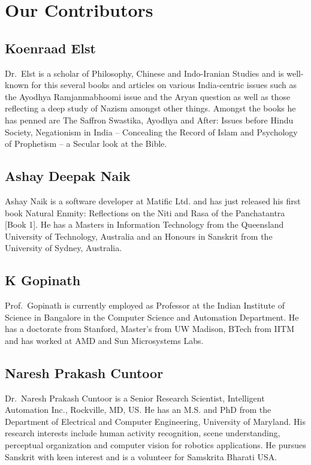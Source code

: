\chapter*{Our Contributors}\label{contributors}

\lhead[\small\thepage]{}
\rhead[]{\small\thepage}
\chead[]{}
\cfoot[]{}

\section*{Koenraad Elst}

Dr.~Elst is a scholar of Philosophy, Chinese and Indo-Iranian Studies and is well-known for this several books and articles on various India-centric issues such as the Ayodhya Ramjanmabhoomi issue and the Aryan question as well as those reflecting a deep study of Nazism amongst other things. Amongst the books he has penned are The Saffron Swastika, Ayodhya and After: Issues before Hindu Society, Negationism in India – Concealing the Record of Islam and Psychology of Prophetism – a Secular look at the Bible. 

\section*{Ashay Deepak Naik}

Ashay Naik is a software developer at Matific Ltd. and has just released his first book Natural Enmity: Reflections on the Niti and Rasa of the Panchatantra [Book 1]. He has a Masters in Information Technology from the Queensland University of Technology, Australia and an Honours in Sanskrit from the University of Sydney, Australia.

\section*{K Gopinath}

Prof.~Gopinath is currently employed as Professor at the Indian Institute of Science in Bangalore in the Computer Science and Automation Department. He has a doctorate from Stanford, Master’s from UW Madison, BTech from IITM and has worked at AMD and Sun Microsystems Labs.

\section*{Naresh Prakash Cuntoor}

Dr.~Naresh Prakash Cuntoor is a Senior Research Scientist, Intelligent Automation Inc., Rockville, MD, US. He has an M.S. and PhD from the Department of Electrical and Computer Engineering, University of Maryland. His research interests include human activity recognition, scene understanding, perceptual organization and computer vision for robotics applications. He pursues Sanskrit with keen interest and is a volunteer for Samskrita Bharati USA.

